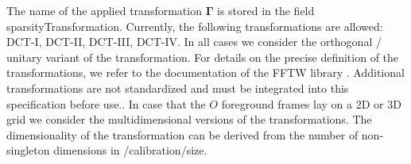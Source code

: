 \documentclass[landscape,a4paper]{article} %
\newcommand{\inlvar}[1]{{\ttfamily#1}}
\begin{document}
\begin{multicols}{2}
The name of the applied transformation $\mathbf{\Gamma}$ is stored in the field \inlvar{sparsityTransformation}. Currently, the following transformations are allowed: DCT-I, DCT-II, DCT-III, DCT-IV. In all cases we consider the orthogonal / unitary variant of the transformation. For details on the precise definition of the transformations, we refer to the documentation of the FFTW library \cite{FFTW05}. 
Additional transformations are not standardized and must be integrated into this specification before use.. In case that the $O$ foreground frames lay on a 2D or 3D grid we consider the multidimensional versions of the transformations. The dimensionality of the transformation can be derived from the number of non-singleton dimensions in \inlvar{/calibration/size}. 

\end{multicols}
\end{document}
